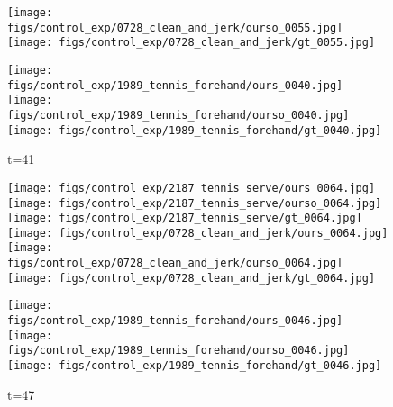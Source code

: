 \documentclass{article}
\begin{document}
\begin{appendix}
\begin{figure*}[!thbp]
\begin{subfigure}{0.12\linewidth}
  		\texttt{[image: figs/control\_exp/0728\_clean\_and\_jerk/ourso\_0055.jpg]}
  		\vspace{.2cm}
  		\texttt{[image: figs/control\_exp/0728\_clean\_and\_jerk/gt\_0055.jpg]}
  		\caption*{t=41}
  		\vspace{-7pt}
  		\texttt{[image: figs/control\_exp/1989\_tennis\_forehand/ours\_0040.jpg]}
  		\texttt{[image: figs/control\_exp/1989\_tennis\_forehand/ourso\_0040.jpg]}
  		\vspace{.2cm}
  		\texttt{[image: figs/control\_exp/1989\_tennis\_forehand/gt\_0040.jpg]}
	\end{subfigure}
	\begin{subfigure}{0.12\linewidth}
        \caption*{t=65}
        \vspace{-7pt}
	    \texttt{[image: figs/control\_exp/2187\_tennis\_serve/ours\_0064.jpg]}
	    \texttt{[image: figs/control\_exp/2187\_tennis\_serve/ourso\_0064.jpg]}
	    \vspace{.2cm}
  		\texttt{[image: figs/control\_exp/2187\_tennis\_serve/gt\_0064.jpg]}
  		\texttt{[image: figs/control\_exp/0728\_clean\_and\_jerk/ours\_0064.jpg]}
  		\texttt{[image: figs/control\_exp/0728\_clean\_and\_jerk/ourso\_0064.jpg]}
  		\vspace{.2cm}
  		\texttt{[image: figs/control\_exp/0728\_clean\_and\_jerk/gt\_0064.jpg]}
  		\caption*{t=47}
  		\vspace{-7pt}
  		\texttt{[image: figs/control\_exp/1989\_tennis\_forehand/ours\_0046.jpg]}
  		\texttt{[image: figs/control\_exp/1989\_tennis\_forehand/ourso\_0046.jpg]}
  		\vspace{.2cm}
  		\texttt{[image: figs/control\_exp/1989\_tennis\_forehand/gt\_0046.jpg]}

\end{subfigure}
\end{figure*}
\end{appendix}
\end{document}
